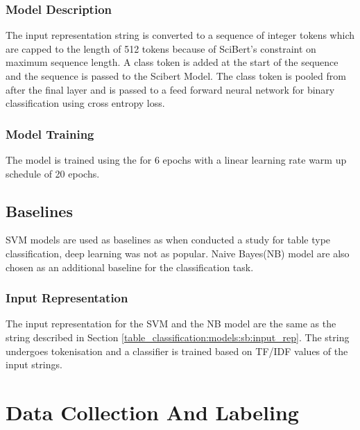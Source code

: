\subsubsection{Model Description}
The input representation string is converted to a sequence of integer tokens which are capped to the length of 512 tokens because of SciBert's constraint on maximum sequence length. A class token is added at the start of the sequence and the sequence is passed to the Scibert Model. The class token is pooled from after the final layer and is passed to a feed forward neural network for binary classification using cross entropy loss. 

\subsubsection{Model Training}
The model is trained using the for 6 epochs with a linear learning rate warm up schedule of 20 epochs.

\subsection{Baselines}
SVM models are used as baselines as when \cite{kim2012scientific} conducted a study for table type classification, deep learning was not as popular. Naive Bayes(NB) model are also chosen as an additional baseline for the classification task. 

\subsubsection{Input Representation}
The input representation for the SVM and the NB model are the same as the string described in Section \ref{table_classification:models:sb:input_rep}. The string undergoes tokenisation and a classifier is trained based on TF/IDF values of the input strings. 


\section{Data Collection And Labeling}
\label{table_classification:data-coll}

